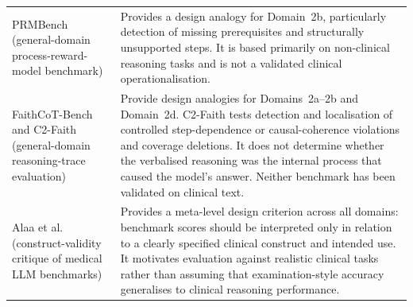 \documentclass{article}
\begin{document}
{\begin{longtable}{p{}p{}}
PRMBench
(general-domain process-reward-model benchmark)
\cite{song2025prmbench}
&
Provides a design analogy for Domain~2b, particularly detection of
missing prerequisites and structurally unsupported steps. It is based
primarily on non-clinical reasoning tasks and is not a validated
clinical operationalisation.
\\

FaithCoT-Bench and C2-Faith
(general-domain reasoning-trace evaluation)
\cite{shen2025faithcotbench,mittal2026c2faith}
&
Provide design analogies for Domains~2a--2b and Domain~2d.
C2-Faith tests detection and localisation of controlled
step-dependence or causal-coherence violations and coverage deletions.
It does not determine whether the verbalised reasoning was the internal
process that caused the model's answer. Neither benchmark has been
validated on clinical text.
\\

Alaa et al.
(construct-validity critique of medical LLM benchmarks)
\cite{alaa2025constructvalidity}
&
Provides a meta-level design criterion across all domains: benchmark
scores should be interpreted only in relation to a clearly specified
clinical construct and intended use. It motivates evaluation against
realistic clinical tasks rather than assuming that examination-style
accuracy generalises to clinical reasoning performance.
\\

\end{longtable}
}
\end{document}
